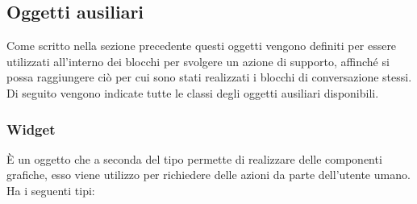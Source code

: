 \subsection{Oggetti ausiliari}
Come scritto nella sezione precedente questi oggetti vengono definiti per essere utilizzati all’interno dei blocchi per svolgere un azione di supporto, affinché si possa raggiungere ciò per cui sono stati realizzati i blocchi di conversazione stessi.\\

Di seguito vengono indicate tutte le classi degli oggetti ausiliari disponibili.

\subsubsection*{Widget}
È un oggetto che a seconda del tipo permette di realizzare delle componenti grafiche, esso viene utilizzo per richiedere delle azioni da parte dell’utente umano.
Ha i seguenti tipi:
